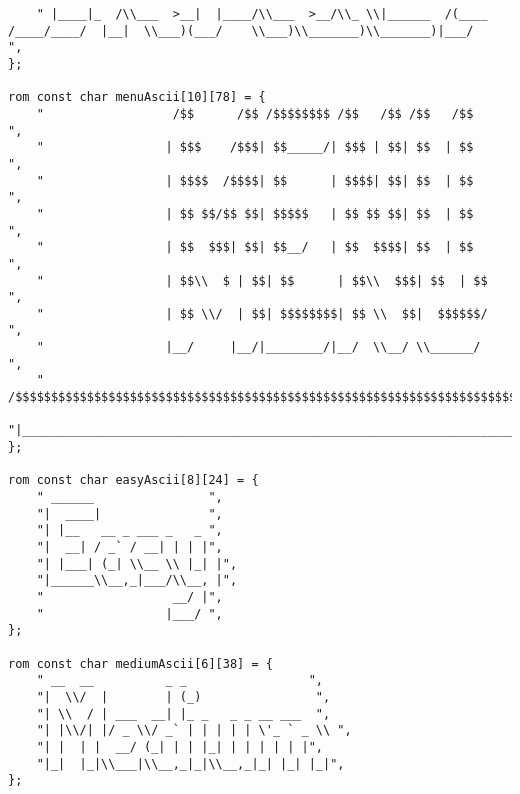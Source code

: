 \begin{lstlisting}
	" |____|_  /\\___  >__|  |____/\\___  >__/\\_ \\|______  /(____  /____/____/  |__|  \\___)(___/    \\___)\\_______)\\_______)|___/     ",
};

rom const char menuAscii[10][78] = {
	"                  /$$      /$$ /$$$$$$$$ /$$   /$$ /$$   /$$                 ",
	"                 | $$$    /$$$| $$_____/| $$$ | $$| $$  | $$                 ",
	"                 | $$$$  /$$$$| $$      | $$$$| $$| $$  | $$                 ",
	"                 | $$ $$/$$ $$| $$$$$   | $$ $$ $$| $$  | $$                 ",
	"                 | $$  $$$| $$| $$__/   | $$  $$$$| $$  | $$                 ",
	"                 | $$\\  $ | $$| $$      | $$\\  $$$| $$  | $$                 ",
	"                 | $$ \\/  | $$| $$$$$$$$| $$ \\  $$|  $$$$$$/                 ",
	"                 |__/     |__/|________/|__/  \\__/ \\______/                  ",
	" /$$$$$$$$$$$$$$$$$$$$$$$$$$$$$$$$$$$$$$$$$$$$$$$$$$$$$$$$$$$$$$$$$$$$$$$$$$$",
	"|___________________________________________________________________________/",
};

rom const char easyAscii[8][24] = {
	" ______                ",
 	"|  ____|               ",
 	"| |__   __ _ ___ _   _ ",
 	"|  __| / _` / __| | | |",
 	"| |___| (_| \\__ \\ |_| |",
 	"|______\\__,_|___/\\__, |",
    "                  __/ |",
    "                 |___/ ",
};

rom const char mediumAscii[6][38] = {
	" __  __          _ _                 ",
	"|  \\/  |        | (_)                ",
	"| \\  / | ___  __| |_ _   _ _ __ ___  ",
	"| |\\/| |/ _ \\/ _` | | | | | \'_ ` _ \\ ",
	"| |  | |  __/ (_| | | |_| | | | | | |",
	"|_|  |_|\\___|\\__,_|_|\\__,_|_| |_| |_|",
};


\end{lstlisting}
